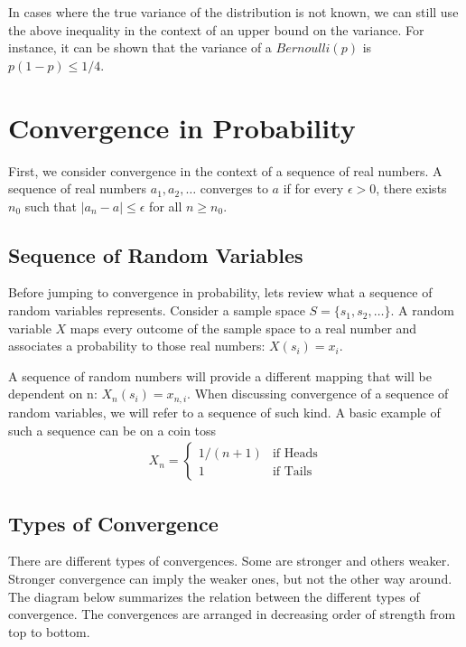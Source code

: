 \documentclass[../probability-notes.tex]{subfiles}
\begin{document}
    In cases where the true variance of the distribution is not known, we can still use the above inequality in the context of an upper bound on the variance. For instance, it can be shown that the variance of a $Bernoulli(p)$ is $p(1-p) \leq 1/4$.

    \section{Convergence in Probability}
    First, we consider convergence in the context of a sequence of real numbers. A sequence of real numbers $a_{1}, a_{2}, \ldots$ converges to $a$ if for every $\epsilon > 0$, there exists $n_{0}$ such that $\lvert a_{n} - a \rvert \leq \epsilon$ for all $n \geq n_{0}$.\newline

    \subsection{Sequence of Random Variables}
    Before jumping to convergence in probability, lets review what a sequence of random variables represents. Consider a sample space $S = \{s_{1}, s_{2}, \ldots\}$. A random variable $X$ maps every outcome of the sample space to a real number and associates a probability to those real numbers: $X(s_{i}) = x_{i}$.\newline

    A sequence of random numbers will provide a different mapping that will be dependent on n: $X_{n}(s_{i}) = x_{n,i}$. When discussing convergence of a sequence of random variables, we will refer to a sequence of such kind. A basic example of such a sequence can be on a coin toss
    \begin{align*}
        X_{n} = \begin{cases} 1/(n+1) &\mbox{if Heads}\\ 1 &\mbox{if Tails} \end{cases}
    \end{align*}

    \subsection{Types of Convergence}
    There are different types of convergences. Some are stronger and others weaker. Stronger convergence can imply the weaker ones, but not the other way around.\newline
    The diagram below summarizes the relation between the different types of convergence. The convergences are arranged in decreasing order of strength from top to bottom.
\end{document}

